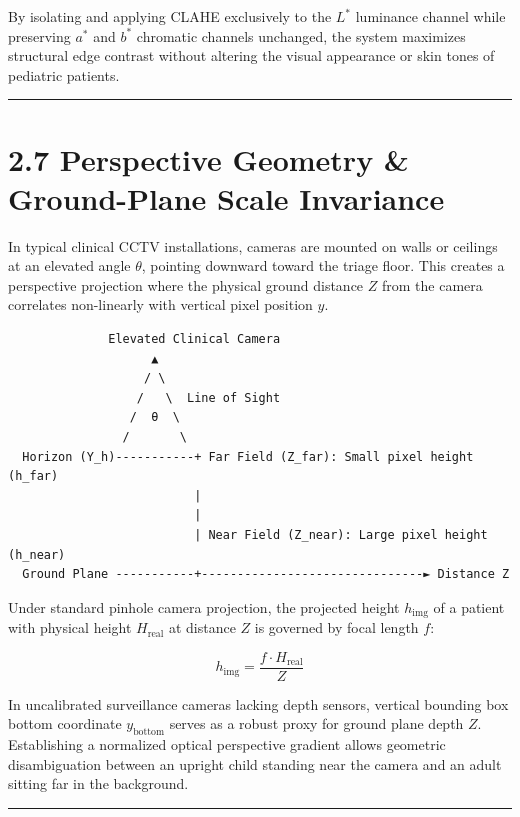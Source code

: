 By isolating and applying CLAHE exclusively to the \(L^*\) luminance
channel while preserving \(a^*\) and \(b^*\) chromatic channels
unchanged, the system maximizes structural edge contrast without
altering the visual appearance or skin tones of pediatric patients.

\begin{center}\rule{0.5\linewidth}{0.5pt}\end{center}

\section{2.7 Perspective Geometry \& Ground-Plane Scale
Invariance}\label{perspective-geometry-ground-plane-scale-invariance}

In typical clinical CCTV installations, cameras are mounted on walls or
ceilings at an elevated angle \(\theta\), pointing downward toward the
triage floor. This creates a perspective projection where the physical
ground distance \(Z\) from the camera correlates non-linearly with
vertical pixel position \(y\).

\begin{verbatim}
              Elevated Clinical Camera
                    ▲
                   / \
                  /   \  Line of Sight
                 /  θ  \
                /       \
  Horizon (Y_h)-----------+ Far Field (Z_far): Small pixel height (h_far)
                          |
                          |
                          | Near Field (Z_near): Large pixel height (h_near)
  Ground Plane -----------+-------------------------------► Distance Z
\end{verbatim}

Under standard pinhole camera projection, the projected height
\(h_{\text{img}}\) of a patient with physical height \(H_{\text{real}}\)
at distance \(Z\) is governed by focal length \(f\):

\[h_{\text{img}} = \frac{f \cdot H_{\text{real}}}{Z}\]

In uncalibrated surveillance cameras lacking depth sensors, vertical
bounding box bottom coordinate \(y_{\text{bottom}}\) serves as a robust
proxy for ground plane depth \(Z\). Establishing a normalized optical
perspective gradient allows geometric disambiguation between an upright
child standing near the camera and an adult sitting far in the
background.

\begin{center}\rule{0.5\linewidth}{0.5pt}\end{center}

